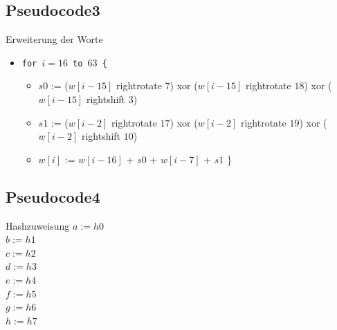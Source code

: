 \documentclass[xcolor=x11names,compress]{beamer}
\renewcommand{\(}{\begin{columns}}
\renewcommand{\)}{\end{columns}}
\newcommand{\<}[1]{\begin{column}{#1}}
\renewcommand{\>}{\end{column}}
\begin{document}
\subsection{Pseudocode3}
\begin{frame}{Erweiterung der Worte}

\begin{itemize}

\item[]
\texttt{for $i=16$ to $63$ \{}
		 \begin{itemize}
		 \item[] $s0$ := ($w[i-15]$ rightrotate $7$) xor ($w[i-15]$ rightrotate $18$) xor ($w[i-15]$ rightshift $3$) \newline
        \item[] $s1$ := ($w[i-2]$ rightrotate $17$) xor ($w[i-2]$ rightrotate $19$) xor ($w[i-2]$ rightshift $10$) \newline
        \item[] $w[i]$ := $w[i-16]$ + $s0$ + $w[i-7]$ + $s1$ \newline \}
		 \end{itemize}
         
\end{itemize}


\end{frame}
\subsection{Pseudocode4}
\begin{frame}{Hashzuweisung}
\texttt{$a := h0$ \\
    $b := h1$ \\
    $c := h2$ \\
    $d := h3$ \\
    $e := h4$ \\
    $f := h5$ \\
    $g := h6$ \\
    $h := h7$} 
\end{frame}
\end{document}
